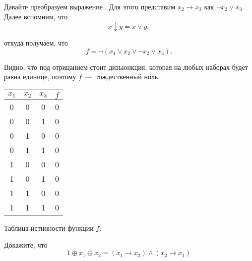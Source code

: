 \begin{solution}

\begin{paracol}{2}

	Давайте преобразуем выражение . 
	Для этого представим $x_2\rightarrow x_3$ как 
	$\neg x_2 \vee x_3$. Далее вспомним, что
	$$x\downarrow y = \overline{x\vee y},$$
	
	\noindent откуда получаем, что
	$$f = \neg(x_1\vee x_2 \vee \neg x_2 \vee x_3).$$

	Видно, что под отрицанием стоит дизъюнкция,
	которая на любых наборах будет равна единице,
	поэтому $f$~---~тождественный ноль.

\switchcolumn
		
\begin{center}
 \begin{tabular}{| c c c | c |}
  \hline	
 $x_1$ & $x_2$ & $x_3$ & $f$ \T\B \\
  \hline\hline
  0 & 0 & 0 & 0 \T\B \\ 
  0 & 0 & 1 & 0 \B \\
  0 & 1 & 0 & 0 \B \\
  0 & 1 & 1 & 0 \B \\
  1 & 0 & 0 & 0 \B \\
  1 & 0 & 1 & 0 \B \\
  1 & 1 & 0 & 0 \B \\
  1 & 1 & 1 & 0 \B \\
  \hline
 \end{tabular}
 \vspace{1cm}
 
 \small Таблица истинности функции $f$.
\end{center}

\end{paracol}
\end{solution}

\begin{exercise}
Докажите, что 
\begin{equation}
		1\oplus x_1\oplus x_2=(x_1\rightarrow x_2)\wedge(x_2\rightarrow x_1)
\end{equation}

\end{exercise}

